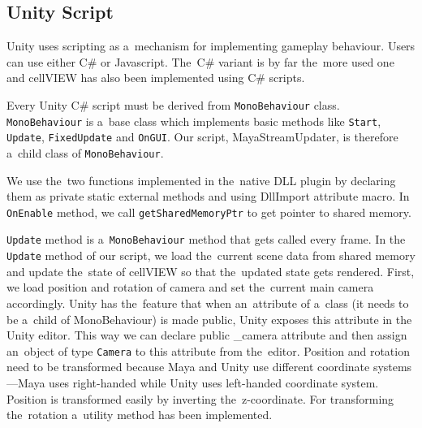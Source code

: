 \documentclass[
  digital, %
  table,   %
  nolof,     %
  nolot,     %
  oneside,
]{fithesis3}
\begin{document}
\subsection{Unity Script}
Unity uses scripting as a mechanism for implementing gameplay behaviour. Users can use either C\# or Javascript. The C\# variant is by far the more used one and cellVIEW has also been implemented using C\# scripts.

Every Unity C\# script must be derived from \texttt{MonoBehaviour} class. \texttt{MonoBehaviour} is a base class which implements basic methods like \texttt{Start}, \texttt{Update}, \texttt{FixedUpdate} and \texttt{OnGUI}. Our script, MayaStreamUpdater, is therefore a child class of \texttt{MonoBehaviour}.

We use the two functions implemented in the native DLL plugin by declaring them as private static external methods and using DllImport attribute macro. In \texttt{OnEnable} method, we call \texttt{getSharedMemoryPtr} to get pointer to shared memory.

\texttt{Update} method is a \texttt{MonoBehaviour} method that gets called every frame. In the \texttt{Update} method of our script, we load the current scene data from shared memory and update the state of cellVIEW so that the updated state gets rendered. First, we load position and rotation of camera and set the current main camera accordingly. Unity has the feature that when an attribute of a class (it needs to be a child of MonoBehaviour) is made public, Unity exposes this attribute in the Unity editor. This way we can declare public \_camera attribute and then assign an object of type \texttt{Camera} to this attribute from the editor. Position and rotation need to be transformed because Maya and Unity use different coordinate systems—Maya uses right-handed while Unity uses left-handed coordinate system. Position is transformed easily by inverting the z-coordinate. For transforming the rotation a utility method has been implemented.
\end{document}
